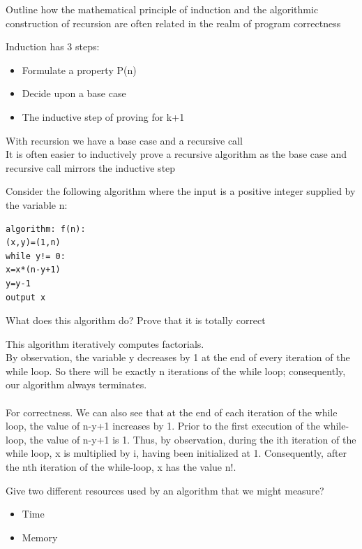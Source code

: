 \documentclass[addpoints]{exam}
\begin{document}
\begin{questions}
\question[4]Outline how the mathematical principle of induction and the algorithmic construction of recursion are often related in the realm of program correctness
\begin{solution}[2in]
	Induction has 3 steps:
	\begin{itemize}
		\item Formulate a property P(n)
		\item Decide upon a base case
		\item The inductive step of proving for k+1
	\end{itemize}
	With recursion we have a base case and a recursive call\\
	It is often easier to inductively prove a recursive algorithm as the base case and recursive call mirrors the inductive step
\end{solution}

\question[7]Consider the following algorithm where the input is a positive integer supplied by the variable n:
\begin{lstlisting}
algorithm: f(n):
(x,y)=(1,n)
while y!= 0:
x=x*(n-y+1)
y=y-1
output x
\end{lstlisting}
What does this algorithm do? Prove that it is totally correct
\begin{solution}[2in]
	This algorithm iteratively computes factorials.\\
	By observation, the variable y decreases by 1 at the end of every iteration of the while loop. So there will be exactly n iterations of the while loop; consequently, our algorithm always terminates.\\
	\\
	For correctness. We can also see that at the end of each iteration of the while loop, the value of n-y+1 increases by 1. Prior to the first execution of the while-loop, the value of n-y+1 is 1. Thus, by observation, during the ith iteration of the while loop, x is multiplied by i, having been initialized at 1. Consequently, after the nth iteration of the while-loop, x has the value n!. 
\end{solution}
\question[2]Give two different resources used by an algorithm that we might measure?
\begin{solution}[2in]
	\begin{itemize}
		\item Time
		\item Memory
	\end{itemize}
\end{solution}


\end{questions}
\end{document}
